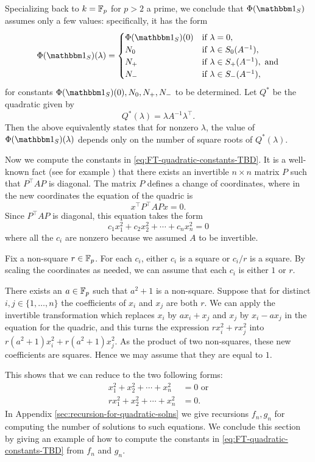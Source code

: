 Specializing back to $k=\mathbb{F}_p$ for $p>2$ a prime, we conclude that $\Phi(\IND_S)$ assumes only a few values: specifically, it has the form
\begin{equation}\label{eq:FT-quadratic-constants-TBD}
	\Phi(\IND_S)(\lambda) = \begin{cases}
		\Phi(\IND_S)(0) & \text{if } \lambda = 0,\\
		N_0 & \text{if } \lambda \in S_0(A^{-1}),\\
		N_+ & \text{if } \lambda \in S_+(A^{-1}), \text{ and}\\
		N_- & \text{if } \lambda \in S_-(A^{-1}),
	\end{cases}
\end{equation}
for constants $\Phi(\IND_S)(0), N_0, N_+, N_-$ to be determined. Let $Q^*$ be the quadratic given by
\[
	Q^*(\lambda) = \lambda A^{-1} \lambda^\top.
\]
Then the above equivalently states that for nonzero $\lambda$, the value of $\Phi(\IND_S)(\lambda)$ depends only on the number of square roots of $Q^*(\lambda)$.

Now we compute the constants in \eqref{eq:FT-quadratic-constants-TBD}. It is a well-known fact (see for example \cite[Prop.~42:1]{omeara}) that there exists an invertible $n\times n$ matrix $P$ such that $P^\top A P$ is diagonal. The matrix $P$ defines a change of coordinates, where in the new coordinates the equation of the quadric is
\[
x^\top P^\top A P x = 0.
\]
Since $P^\top A P$ is diagonal, this equation takes the form
\[
c_1 x_1^2 + c_2 x_2^2 + \cdots + c_n x_n^2 = 0
\]
where all the $c_i$ are nonzero because we assumed $A$ to be invertible.

Fix a non-square $r\in \mathbb{F}_p$. For each $c_i$, either $c_i$ is a square or $c_i / r$ is a square. By scaling the coordinates as needed, we can assume that each $c_i$ is either $1$ or $r$.

There exists an $a\in\mathbb{F}_p$ such that $a^2 + 1$ is a non-square. Suppose that for distinct $i,j\in\{1,\ldots,n\}$ the coefficients of $x_i$ and $x_j$ are both $r$. We can apply the invertible transformation which replaces $x_i$ by $ax_i + x_j$ and $x_j$ by $x_i - ax_j$ in the equation for the quadric, and this turns the expression $rx_i^2 + rx_j^2$ into $r(a^2 + 1)x_i^2 + r(a^2+1)x_j^2$. As the product of two non-squares, these new coefficients are squares. Hence we may assume that they are equal to $1$.

This shows that we can reduce to the two following forms:
\begin{align}
x_1^2 + x_2^2 + \cdots + x_n^2 &= 0\text{ or} \tag{Q1}\label{eq:Q1}\\ 
rx_1^2 + x_2^2 + \cdots + x_n^2 &= 0. \tag{Q2}\label{eq:Q2}
\end{align}
In Appendix \ref{sec:recursion-for-quadratic-solns} we give recursions $f_n, g_n$ for computing the number of solutions to such equations. We conclude this section by giving an example of how to compute the constants in \eqref{eq:FT-quadratic-constants-TBD} from $f_n$ and $g_n$.

